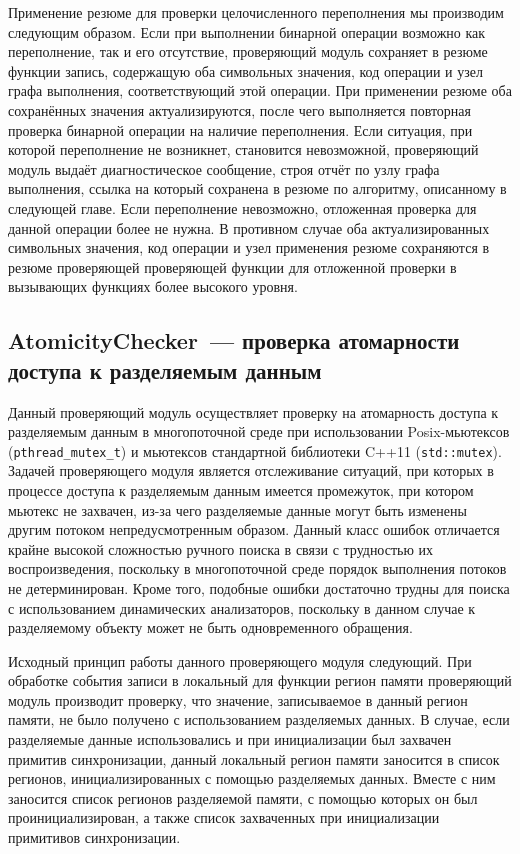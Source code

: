 Применение резюме для проверки целочисленного переполнения мы производим следующим образом. Если при выполнении бинарной операции возможно как переполнение, так и его отсутствие, проверяющий модуль сохраняет в резюме функции запись, содержащую оба символьных значения, код операции и узел графа выполнения, соответствующий этой операции. При применении резюме оба сохранённых значения актуализируются, после чего выполняется повторная проверка бинарной операции на наличие переполнения. Если ситуация, при которой переполнение не возникнет, становится невозможной, проверяющий модуль выдаёт диагностическое сообщение, строя отчёт по узлу графа выполнения, ссылка на который сохранена в резюме по алгоритму, описанному в следующей главе. Если переполнение невозможно, отложенная проверка для данной операции более не нужна. В противном случае оба актуализированных символьных значения, код операции и узел применения резюме сохраняются в резюме проверяющей проверяющей функции для отложенной проверки в вызывающих функциях более высокого уровня.

\subsection{AtomicityChecker~--- проверка атомарности доступа к разделяемым данным}

Данный проверяющий модуль осуществляет проверку на атомарность доступа к разделяемым данным в многопоточной среде при использовании Posix-мьютексов (\texttt{pthread\_mutex\_t}) и мьютексов стандартной библиотеки C++11 (\texttt{std::mutex}). Задачей проверяющего модуля является отслеживание ситуаций, при которых в процессе доступа к разделяемым данным имеется промежуток, при котором мьютекс не захвачен, из-за чего разделяемые данные могут быть изменены другим потоком непредусмотренным образом. Данный класс ошибок отличается крайне высокой сложностью ручного поиска в связи с трудностью их воспроизведения, поскольку в многопоточной среде порядок выполнения потоков не детерминирован. Кроме того, подобные ошибки достаточно трудны для поиска с использованием динамических анализаторов, поскольку в данном случае к разделяемому объекту может не быть одновременного обращения.

Исходный принцип работы данного проверяющего модуля следующий. При обработке события записи в локальный для функции регион памяти проверяющий модуль производит проверку, что значение, записываемое в данный регион памяти, не было получено с использованием разделяемых данных. В случае, если разделяемые данные использовались и при инициализации был захвачен примитив синхронизации, данный локальный регион памяти заносится в список регионов, инициализированных с помощью разделяемых данных. Вместе с ним заносится список регионов разделяемой памяти, с помощью которых он был проинициализирован, а также список захваченных при инициализации примитивов синхронизации.

